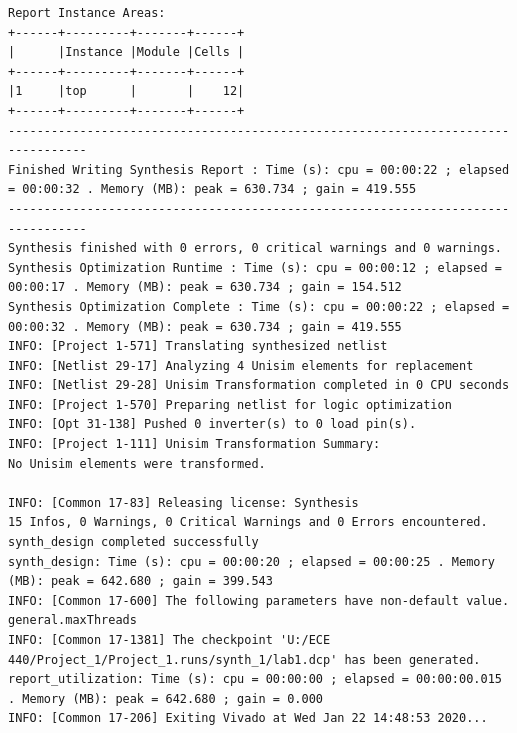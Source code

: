 \documentclass[a4paper, 12pt]{article}
\begin{document}
\begin{verbatim}
Report Instance Areas: 
+------+---------+-------+------+
|      |Instance |Module |Cells |
+------+---------+-------+------+
|1     |top      |       |    12|
+------+---------+-------+------+
---------------------------------------------------------------------------------
Finished Writing Synthesis Report : Time (s): cpu = 00:00:22 ; elapsed = 00:00:32 . Memory (MB): peak = 630.734 ; gain = 419.555
---------------------------------------------------------------------------------
Synthesis finished with 0 errors, 0 critical warnings and 0 warnings.
Synthesis Optimization Runtime : Time (s): cpu = 00:00:12 ; elapsed = 00:00:17 . Memory (MB): peak = 630.734 ; gain = 154.512
Synthesis Optimization Complete : Time (s): cpu = 00:00:22 ; elapsed = 00:00:32 . Memory (MB): peak = 630.734 ; gain = 419.555
INFO: [Project 1-571] Translating synthesized netlist
INFO: [Netlist 29-17] Analyzing 4 Unisim elements for replacement
INFO: [Netlist 29-28] Unisim Transformation completed in 0 CPU seconds
INFO: [Project 1-570] Preparing netlist for logic optimization
INFO: [Opt 31-138] Pushed 0 inverter(s) to 0 load pin(s).
INFO: [Project 1-111] Unisim Transformation Summary:
No Unisim elements were transformed.

INFO: [Common 17-83] Releasing license: Synthesis
15 Infos, 0 Warnings, 0 Critical Warnings and 0 Errors encountered.
synth_design completed successfully
synth_design: Time (s): cpu = 00:00:20 ; elapsed = 00:00:25 . Memory (MB): peak = 642.680 ; gain = 399.543
INFO: [Common 17-600] The following parameters have non-default value.
general.maxThreads
INFO: [Common 17-1381] The checkpoint 'U:/ECE 440/Project_1/Project_1.runs/synth_1/lab1.dcp' has been generated.
report_utilization: Time (s): cpu = 00:00:00 ; elapsed = 00:00:00.015 . Memory (MB): peak = 642.680 ; gain = 0.000
INFO: [Common 17-206] Exiting Vivado at Wed Jan 22 14:48:53 2020...
\end{verbatim}
\end{document}
